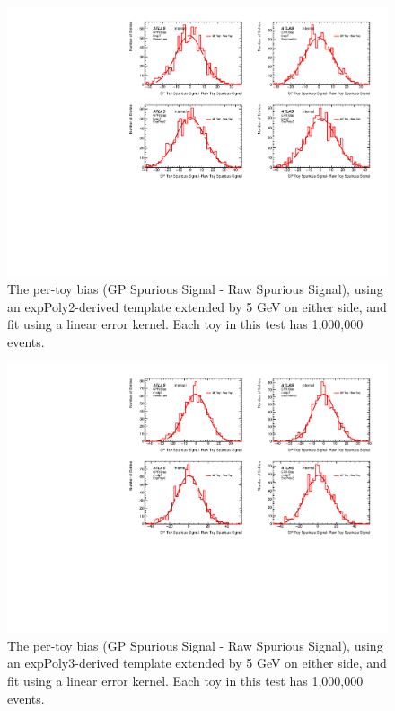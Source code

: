 \begin{figure} 
\begin{center}
  \includegraphics[width=\textwidth]{figures/background/gpr/validation/linear/ToyTest_FitSigBiases_lowpT_1M_noSig}   
\caption{The per-toy bias (GP Spurious Signal - Raw Spurious Signal), using an expPoly2-derived template extended by 5 GeV on either side, and fit using a linear error kernel. Each toy in this test has 1,000,000 events.}
\label{fig:bias_linearkernel_lowpt_1M_noSig}
\end{center}
\end{figure}

\begin{figure} 
\begin{center}
  \includegraphics[width=\textwidth]{figures/background/gpr/validation/linear/ToyTest_FitSigBiases_medpT_1M_noSig}   
\caption{The per-toy bias (GP Spurious Signal - Raw Spurious Signal), using an expPoly3-derived template extended by 5 GeV on either side, and fit using a linear error kernel. Each toy in this test has 1,000,000 events.}
\label{fig:bias_linearkernel_medpt_1M_noSig}
\end{center}
\end{figure}

